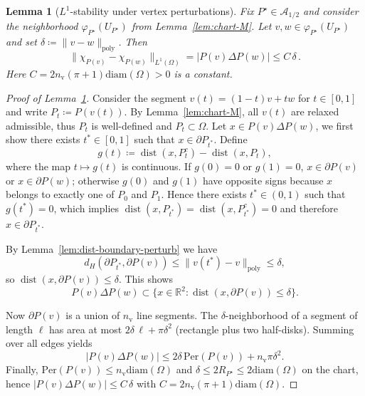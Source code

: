 \documentclass{article}
\newcommand{\R}{\mathbb{R}}
\newtheorem{lemma}[theorem]{Lemma}
\newcommand{\Per}{\mathrm{Per}}
\newcommand{\diam}{\mathrm{diam}}
\newcommand{\dist}{\operatorname{dist}}
\begin{document}
\begin{lemma}[$L^1$-stability under vertex perturbations]\label{lem:symdiff_poly}
Fix $P^\star\in\mathcal A_{1/2}$ and consider the neighborhood $\varphi_{P^\star}(U_{P^\star})$
from Lemma~\ref{lem:chart-M}. Let $v,w\in\varphi_{P^\star}(U_{P^\star})$ and set
$\delta\coloneqq \|v-w\|_{\mathrm{poly}}$.
Then
\[
\|\chi_{P(v)}-\chi_{P(w)}\|_{L^1(\Omega)}
= |P(v)\Delta P(w)| \le C\,\delta\,.
\]
Here $C=2n_{\mathrm v}(\pi+1) \diam(\Omega)>0$ is a constant.
\end{lemma}
\begin{proof}[Proof of Lemma~\ref{lem:symdiff_poly}]
Consider the segment $v(t)=(1-t)v+tw$ for $t\in[0,1]$ and write $P_t\coloneqq P(v(t))$. 
By Lemma~\ref{lem:chart-M}, all $v(t)$ are relaxed admissible, thus $P_t$ is well-defined and $P_t\subset\Omega$.
Let $x\in P(v)\Delta P(w)$, we first show there exists $t^\ast\in[0,1]$ such that $x\in\partial P_{t^\ast}$.
Define
\[
g(t)\coloneqq \dist(x,P_t^c)-\dist(x,P_t),
\]
where the map $t\mapsto g(t)$ is continuous.
If $g(0)=0$ or $g(1)=0$, $x \in \partial P(v)$ or $x \in \partial P(w)$; otherwise  $g(0)$ and $g(1)$ have opposite signs because $x$ belongs
to exactly one of $P_0$ and $P_1$. Hence there exists $t^\ast\in(0,1)$ such that $g(t^\ast)=0$, which implies
$\dist(x,P_{t^\ast})=\dist(x,P_{t^\ast}^c)=0$ and therefore $x\in\partial P_{t^\ast}$.

By Lemma~\ref{lem:dist-boundary-perturb} we have
\[
d_H(\partial P_{t^\ast},\partial P(v))
\le \|v(t^\ast)-v\|_{\mathrm{poly}}\le \delta,
\]
so $\dist(x,\partial P(v))\le\delta$. This shows
\[
P(v)\Delta P(w)\subset \{x\in\R^2:\dist(x,\partial P(v))\le\delta\}.
\]

Now $\partial P(v)$ is a union of $n_{\mathrm v}$ line segments. The $\delta$-neighborhood of a segment of
length $\ell$ has area at most $2\delta\,\ell+\pi\delta^2$ (rectangle plus two half-disks).
Summing over all edges yields
\[
|P(v)\Delta P(w)|
\le 2\delta\,\Per(P(v)) + n_{\mathrm v}\pi\delta^2.
\]
Finally, $\Per(P(v))\le n_{\mathrm v}\diam(\Omega)$ and $\delta\le 2R_{P^\star}\leq 2 \diam(\Omega)$ on the chart, hence $|P(v)\Delta P(w)| \le C\,\delta$ with $C=2n_{\mathrm v}(\pi+1) \diam(\Omega)$.
\end{proof}
\end{document}
